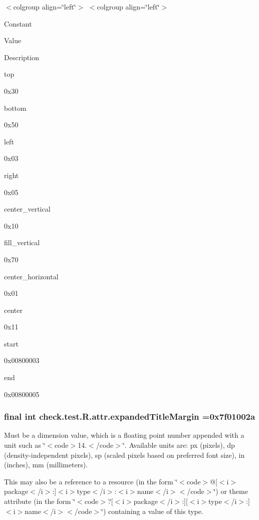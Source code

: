 \begin{TabularC}{0}
\hline
\end{TabularC}
$<$colgroup align=\char`\"{}left\char`\"{}$>$ $<$colgroup align=\char`\"{}left\char`\"{}$>$ 

Constant

Value

Description 

{\ttfamily top}

0x30

{\ttfamily bottom}

0x50

{\ttfamily left}

0x03

{\ttfamily right}

0x05

{\ttfamily center\+\_\+vertical}

0x10

{\ttfamily fill\+\_\+vertical}

0x70

{\ttfamily center\+\_\+horizontal}

0x01

{\ttfamily center}

0x11

{\ttfamily start}

0x00800003

{\ttfamily end}

0x00800005\hypertarget{classcheck_1_1test_1_1_r_1_1attr_ae7ba337e417e42b557bf230f1801e60c}{}
\subsubsection[{expanded\+Title\+Margin}]{\setlength{\rightskip}{0pt plus 5cm}final int check.\+test.\+R.\+attr.\+expanded\+Title\+Margin =0x7f01002a\hspace{0.3cm}{\ttfamily [static]}}\label{classcheck_1_1test_1_1_r_1_1attr_ae7ba337e417e42b557bf230f1801e60c}
Must be a dimension value, which is a floating point number appended with a unit such as \char`\"{}$<$code$>$14.\+5sp$<$/code$>$\char`\"{}. Available units are\+: px (pixels), dp (density-\/independent pixels), sp (scaled pixels based on preferred font size), in (inches), mm (millimeters). 

This may also be a reference to a resource (in the form \char`\"{}$<$code$>$@\mbox{[}$<$i$>$package$<$/i$>$\+:\mbox{]}$<$i$>$type$<$/i$>$\+:$<$i$>$name$<$/i$>$$<$/code$>$\char`\"{}) or theme attribute (in the form \char`\"{}$<$code$>$?\mbox{[}$<$i$>$package$<$/i$>$\+:\mbox{]}\mbox{[}$<$i$>$type$<$/i$>$\+:\mbox{]}$<$i$>$name$<$/i$>$$<$/code$>$\char`\"{}) containing a value of this type. \hypertarget{classcheck_1_1test_1_1_r_1_1attr_aecfd01acd4ec8625740c74f45afd13a6}{}
